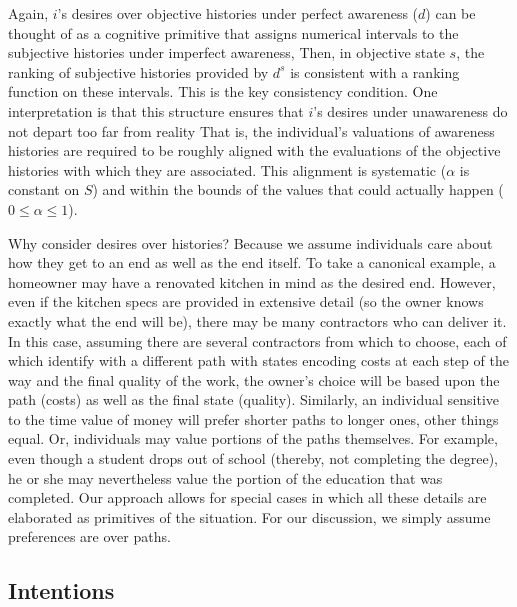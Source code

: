 \documentclass[
11pt,
titlepage,
reqno,
]{article}%
\theoremstyle{definition}
\begin{document}
Again, $i$'s desires over objective histories under perfect awareness ($d$) can be thought of as a cognitive primitive that assigns numerical intervals to the subjective histories under imperfect awareness,
Then, in objective state $s$, the ranking of subjective histories provided by $d^s$ is consistent with a ranking function on these intervals. 
This is the key consistency condition. 
One interpretation is that this structure ensures that $i$'s desires under unawareness do not depart too far from reality
That is, the individual's valuations of awareness histories are required to be roughly aligned with the evaluations of the objective histories with which they are associated.
This alignment is systematic ($\alpha$ is constant on $S$) and within the bounds of the values that could actually happen ($0\le\alpha\le1$). 

  

	
Why consider desires over histories? 
Because we assume individuals care about how they get to an end as well as the end itself. 
To take a canonical example, a homeowner may have a renovated kitchen in mind as the desired end. 
However, even if the kitchen specs are provided in extensive detail (so the owner knows exactly what the end will be), there may be many contractors who can deliver it. 
In this case, assuming there are several contractors from which to choose, each of which identify with a different path with states encoding costs  at each step of the way and the final quality of the work, the owner's choice will be based upon the path (costs) as well as the final state (quality). 
Similarly, an individual sensitive to the time value of money will prefer shorter paths to longer ones, other things equal. 
Or, individuals may value portions of the paths themselves.
For example, even though a student drops out of school (thereby, not completing the degree), he or she may nevertheless value the portion of the education that was completed. 
Our approach allows for special cases in which all these details are elaborated as primitives of the situation. For our discussion, we simply assume preferences are over paths.    


	
	
\subsection{Intentions} \label{sec: intentions}
	
\end{document}
